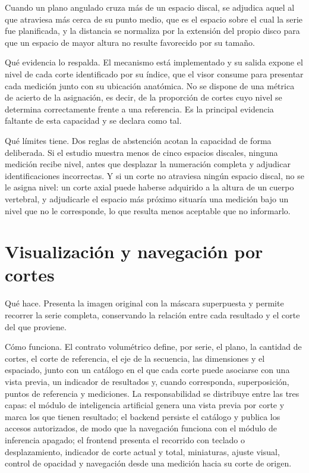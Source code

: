 Cuando un plano angulado cruza más de un espacio discal, se adjudica aquel al que atraviesa más cerca de su punto medio, que es el espacio sobre el cual la serie fue planificada, y la distancia se normaliza por la extensión del propio disco para que un espacio de mayor altura no resulte favorecido por su tamaño.

Qué evidencia lo respalda. El mecanismo está implementado y su salida expone el nivel de cada corte identificado por su índice, que el visor consume para presentar cada medición junto con su ubicación anatómica. No se dispone de una métrica de acierto de la asignación, es decir, de la proporción de cortes cuyo nivel se determina correctamente frente a una referencia. Es la principal evidencia faltante de esta capacidad y se declara como tal.

Qué límites tiene. Dos reglas de abstención acotan la capacidad de forma deliberada. Si el estudio muestra menos de cinco espacios discales, ninguna medición recibe nivel, antes que desplazar la numeración completa y adjudicar identificaciones incorrectas. Y si un corte no atraviesa ningún espacio discal, no se le asigna nivel: un corte axial puede haberse adquirido a la altura de un cuerpo vertebral, y adjudicarle el espacio más próximo situaría una medición bajo un nivel que no le corresponde, lo que resulta menos aceptable que no informarlo.

\section{Visualización y navegación por cortes}

Qué hace. Presenta la imagen original con la máscara superpuesta y permite recorrer la serie completa, conservando la relación entre cada resultado y el corte del que proviene.

Cómo funciona. El contrato volumétrico define, por serie, el plano, la cantidad de cortes, el corte de referencia, el eje de la secuencia, las dimensiones y el espaciado, junto con un catálogo en el que cada corte puede asociarse con una vista previa, un indicador de resultados y, cuando corresponda, superposición, puntos de referencia y mediciones. La responsabilidad se distribuye entre las tres capas: el módulo de inteligencia artificial genera una vista previa por corte y marca los que tienen resultado; el backend persiste el catálogo y publica los accesos autorizados, de modo que la navegación funciona con el módulo de inferencia apagado; el frontend presenta el recorrido con teclado o desplazamiento, indicador de corte actual y total, miniaturas, ajuste visual, control de opacidad y navegación desde una medición hacia su corte de origen.

